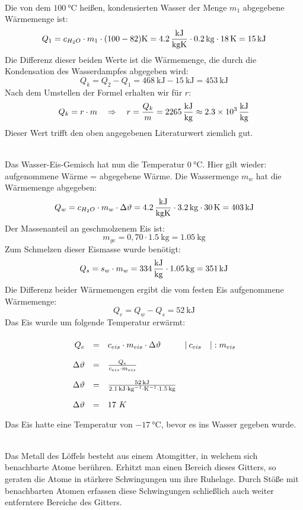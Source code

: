 \documentclass[a4paper]{article}
\begin{document}
\\
Die von dem $\SI{100}{\celsius}$ heißen, kondensierten Wasser der Menge $m_1$ abgegebene Wärmemenge ist:
$$Q_1=c_{H_2O}\cdot m_1 \cdot (100-82)\SI{}{\kelvin} = \SI{4,2}{\kilo\joule\over \kilogram\kelvin}\cdot \SI{0,2}{\kilogram} \cdot \SI{18}{\kelvin} = \SI{15}{\kilo\joule}$$
Die Differenz dieser beiden Werte ist die Wärmemenge, die durch die Kondensation des Wasserdampfes abgegeben wird:
$$Q_k= Q_2-Q_1=\SI{468}{\kilo\joule}-\SI{15}{\kilo\joule}=\SI{453}{\kilo\joule}$$
Nach dem Umstellen der Formel erhalten wir für $r$:
$$Q_k = r\cdot m \quad \Rightarrow \quad r= {Q_k \over m} =\SI{2265}{\kilo\joule\over \kilogram} \approx \SI{2,3e3}{\kilo\joule\over \kilogram} $$
Dieser Wert trifft den oben angegebenen Literaturwert ziemlich gut.
 \vspace{0.5 cm}
 
\\
Das Wasser-Eis-Gemisch hat nun die Temperatur $\SI{0}{\celsius}$. Hier gilt wieder: aufgenommene Wärme = abgegebene Wärme. Die Wassermenge $m_w$ hat die Wärmemenge abgegeben:
$$Q_w = c_{H_2O}\cdot m_w \cdot \Delta \vartheta =\SI{4,2}{\kilo\joule\over \kilogram\kelvin} \cdot \SI{3,2}{\kilogram} \cdot \SI{30}{\kelvin} = \SI{403}{\kilo\joule}$$
Der Massenanteil an geschmolzenem Eis ist:
$$m_{ge}=0,70 \cdot \SI{1,5}{\kilogram}= \SI{1,05}{\kilogram}$$
Zum Schmelzen dieser Eismasse wurde benötigt:
$$Q_s=s_w \cdot m_w = \SI{334}{\kilo\joule\over \kilogram} \cdot \SI{1,05}{\kilogram}=\SI{351}{\kilo\joule}$$
Die Differenz beider Wärmemengen ergibt die vom festen Eis aufgenommene Wärmemenge:
$$Q_e = Q_w-Q_s=\SI{52}{\kilo\joule}$$
Das Eis wurde um folgende Temperatur erwärmt:
$$
\renewcommand{\arraystretch}{2}
\begin{array}{rcll}
Q_e &=& c_{eis}\cdot m_{eis}\cdot \Delta \vartheta &|\: c_{eis} \quad |: m_{eis}\\
\Delta \vartheta &=& {Q_e \over c_{eis}\cdot m_{eis}}\\
\Delta \vartheta &=& {\SI{52}{\kilo\joule}\over \SI{2,1}{\kilo\joule\cdot\kilogram^{-1}\cdot\kelvin^{-1}}\cdot \SI{1,5}{\kilogram}}\\
\Delta \vartheta &=& 17~K
\end{array}
$$ 
Das Eis hatte eine Temperatur von $\SI{-17}{\celsius}$, bevor es ins Wasser gegeben wurde.
\vspace{0.5 cm}

\\
Das Metall des Löffels besteht aus einem Atomgitter, in welchem sich benachbarte Atome berühren. Erhitzt man einen Bereich dieses Gitters, so geraten die Atome in stärkere Schwingungen um ihre Ruhelage. Durch Stöße mit benachbarten Atomen erfassen diese Schwingungen schließlich auch weiter entferntere Bereiche des Gitters.
\vspace{0.5 cm}
\end{document}
